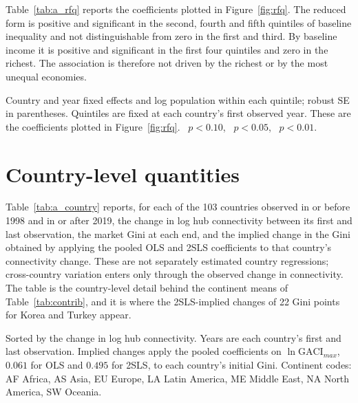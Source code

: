 Table~\ref{tab:a_rfq} reports the coefficients plotted in Figure~\ref{fig:rfq}. The reduced form is positive and significant in the second, fourth and fifth quintiles of baseline inequality and not distinguishable from zero in the first and third. By baseline income it is positive and significant in the first four quintiles and zero in the richest. The association is therefore not driven by the richest or by the most unequal economies.

\begin{table}[H]\centering\caption{Reduced form of the Feyrer instrument on the market Gini, by baseline quintile.}\label{tab:a_rfq}
\begin{threeparttable}\small
\begin{tablenotes}\footnotesize\item Country and year fixed effects and log population within each quintile; robust SE in parentheses. Quintiles are fixed at each country's first observed year. These are the coefficients plotted in Figure~\ref{fig:rfq}. \sym{*}~$p<0.10$, \sym{**}~$p<0.05$, \sym{***}~$p<0.01$.\end{tablenotes}\end{threeparttable}\end{table}

\section{Country-level quantities}
\label{app:country}
Table~\ref{tab:a_country} reports, for each of the 103 countries observed in or before 1998 and in or after 2019, the change in log hub connectivity between its first and last observation, the market Gini at each end, and the implied change in the Gini obtained by applying the pooled OLS and 2SLS coefficients to that country's connectivity change. These are not separately estimated country regressions; cross-country variation enters only through the observed change in connectivity. The table is the country-level detail behind the continent means of Table~\ref{tab:contrib}, and it is where the 2SLS-implied changes of 22 Gini points for Korea and Turkey appear.

\begin{table}[H]\centering\caption{Implied contribution of hub-connectivity growth to the market Gini, by country.}\label{tab:a_country}
\begin{threeparttable}\scriptsize
\begin{tablenotes}\scriptsize\item Sorted by the change in log hub connectivity. Years are each country's first and last observation. Implied changes apply the pooled coefficients on $\ln\mathrm{GACI}_{max}$, $0.061$ for OLS and $0.495$ for 2SLS, to each country's initial Gini. Continent codes: AF Africa, AS Asia, EU Europe, LA Latin America, ME Middle East, NA North America, SW Oceania.\end{tablenotes}\end{threeparttable}\end{table}

